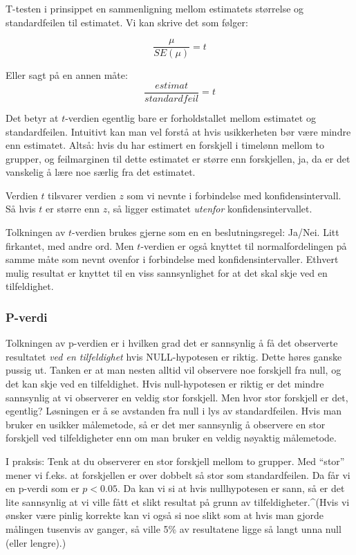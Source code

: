 \documentclass[
  norsk,
  letterpaper,
  DIV=11,
  numbers=noendperiod]{scrreprt}
\theoremstyle{definition}
\theoremstyle{remark}
\begin{document}
T-testen i prinsippet en sammenligning mellom estimatets størrelse og
standardfeilen til estimatet. Vi kan skrive det som følger:

\[
 \frac{\mu}{SE(\mu)} = t 
\]

Eller sagt på en annen måte: \[
 \frac{estimat}{standardfeil} = t 
\]

Det betyr at \(t\)-verdien egentlig bare er forholdstallet mellom
estimatet og standardfeilen. Intuitivt kan man vel forstå at hvis
usikkerheten bør være mindre enn estimatet. Altså: hvis du har estimert
en forskjell i timelønn mellom to grupper, og feilmarginen til dette
estimatet er større enn forskjellen, ja, da er det vanskelig å lære noe
særlig fra det estimatet.

Verdien \(t\) tilsvarer verdien \(z\) som vi nevnte i forbindelse med
konfidensintervall. Så hvis \(t\) er større enn \(z\), så ligger
estimatet \emph{utenfor} konfidensintervallet.

Tolkningen av \(t\)-verdien brukes gjerne som en en beslutningsregel:
Ja/Nei. Litt firkantet, med andre ord. Men \(t\)-verdien er også knyttet
til normalfordelingen på samme måte som nevnt ovenfor i forbindelse med
konfidensintervaller. Ethvert mulig resultat er knyttet til en viss
sannsynlighet for at det skal skje ved en tilfeldighet.

\subsubsection{P-verdi}\label{p-verdi}

Tolkningen av p-verdien er i hvilken grad det er sannsynlig å få det
observerte resultatet \emph{ved en tilfeldighet} hvis NULL-hypotesen er
riktig. Dette høres ganske pussig ut. Tanken er at man nesten alltid vil
observere noe forskjell fra null, og det kan skje ved en tilfeldighet.
Hvis null-hypotesen er riktig er det mindre sannsynlig at vi observerer
en veldig stor forskjell. Men hvor stor forskjell er det, egentlig?
Løsningen er å se avstanden fra null i lys av standardfeilen. Hvis man
bruker en usikker målemetode, så er det mer sannsynlig å observere en
stor forskjell ved tilfeldigheter enn om man bruker en veldig nøyaktig
målemetode.

I praksis: Tenk at du observerer en stor forskjell mellom to grupper.
Med ``stor'' mener vi f.eks. at forskjellen er over dobbelt så stor som
standardfeilen. Da får vi en p-verdi som er \(p < 0.05\). Da kan vi si
at hvis nullhypotesen er sann, så er det lite sannsynlig at vi ville
fått et slikt resultat på grunn av tilfeldigheter.\^{}(Hvis vi ønsker
være pinlig korrekte kan vi også si noe slikt som at hvis man gjorde
målingen tusenvis av ganger, så ville 5\% av resultatene ligge så langt
unna null (eller lengre).)
\end{document}
